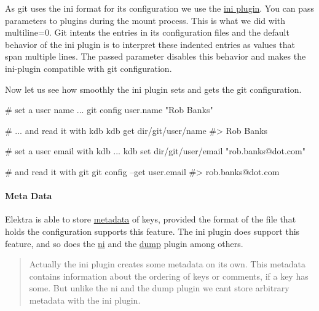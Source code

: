 

As git uses the {\ttfamily ini} format for its configuration we use the \hyperlink{md_src_plugins_ini_README_src_plugins_ini_README_md}{ini plugin}. You can pass parameters to plugins during the mount process. This is what we did with {\ttfamily multiline=0}. Git intents the entries in its configuration files and the default behavior of the {\ttfamily ini} plugin is to interpret these indented entries as values that span multiple lines. The passed parameter disables this behavior and makes the ini-\/plugin compatible with git configuration.

Now let us see how smoothly the ini plugin sets and gets the git configuration.


\begin{DoxyCode}
# set a user name ...
git config user.name "Rob Banks"

# ... and read it with kdb
kdb get dir/git/user/name
#> Rob Banks

# set a user email with kdb ...
kdb set dir/git/user/email "rob.banks@dot.com"

# and read it with git
git config --get user.email
#> rob.banks@dot.com
\end{DoxyCode}


\paragraph*{Meta Data}

Elektra is able to store \hyperlink{md_doc_help_elektra-metadata_doc_help_elektra-metadata_md}{metadata} of keys, provided the format of the file that holds the configuration supports this feature. The ini plugin does support this feature, and so does the \hyperlink{md_src_plugins_ni_README_src_plugins_ni_README_md}{ni} and the \hyperlink{md_src_plugins_dump_README_src_plugins_dump_README_md}{dump} plugin among others.

\begin{quote}
Actually the ini plugin creates some metadata on its own. This metadata contains information about the ordering of keys or comments, if a key has some. But unlike the ni and the dump plugin we can\textquotesingle{}t store arbitrary metadata with the ini plugin. \end{quote}


